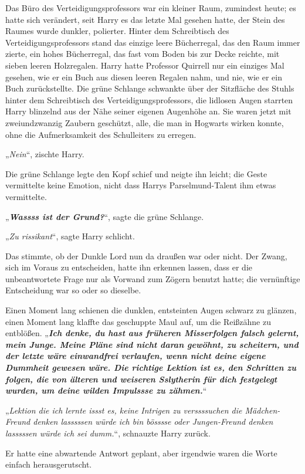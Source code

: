 {Das Büro des Verteidigungsprofessors war ein kleiner Raum, zumindest heute; es hatte sich verändert, seit Harry es das letzte Mal gesehen hatte, der Stein des Raumes wurde dunkler, polierter. Hinter dem Schreibtisch des Verteidigungsprofessors stand das einzige leere Bücherregal, das den Raum immer zierte, ein hohes Bücherregal, das fast vom Boden bis zur Decke reichte, mit sieben leeren Holzregalen. Harry hatte Professor Quirrell nur ein einziges Mal gesehen, wie er ein Buch aus diesen leeren Regalen nahm, und nie, wie er ein Buch zurückstellte. Die grüne Schlange schwankte über der Sitzfläche des Stuhls hinter dem Schreibtisch des Verteidigungsprofessors, die lidlosen Augen starrten Harry blinzelnd aus der Nähe seiner eigenen Augenhöhe an. Sie waren jetzt mit zweiundzwanzig Zaubern geschützt, alle, die man in Hogwarts wirken konnte, ohne die Aufmerksamkeit des Schulleiters zu erregen.

„\emph{Nein}“, zischte Harry.

Die grüne Schlange legte den Kopf schief und neigte ihn leicht; die Geste vermittelte keine Emotion, nicht dass Harrys Parselmund-Talent ihm etwas vermittelte.

„\textbf{\emph{Wassss ist der Grund?}}“, sagte die grüne Schlange.

„\emph{Zu rissikant}“, sagte Harry schlicht.

Das stimmte, ob der Dunkle Lord nun da draußen war oder nicht. Der Zwang, sich im Voraus zu entscheiden, hatte ihn erkennen lassen, dass er die unbeantwortete Frage nur als Vorwand zum Zögern benutzt hatte; die vernünftige Entscheidung war so oder so dieselbe.

Einen Moment lang schienen die dunklen, entsteinten Augen schwarz zu glänzen, einen Moment lang klaffte das geschuppte Maul auf, um die Reißzähne zu entblößen. „\textbf{\emph{Ich denke, du hast aus früheren Misserfolgen falsch gelernt, mein Junge. Meine Pläne sind nicht daran gewöhnt, zu scheitern, und der letzte wäre einwandfrei verlaufen, wenn nicht deine eigene Dummheit gewesen wäre. Die richtige Lektion ist es, den Schritten zu folgen, die von älteren und weiseren Sslytherin für dich festgelegt wurden, um deine wilden Impulssse zu zähmen.}}“

„\emph{Lektion die ich lernte issst es, keine Intrigen zu verssssuchen die Mädchen-Freund denken lasssssen würde ich bin bösssse oder Jungen-Freund denken lasssssen würde ich sei dumm.}“, schnauzte Harry zurück.

Er hatte eine abwartende Antwort geplant, aber irgendwie waren die Worte einfach herausgerutscht.

}
